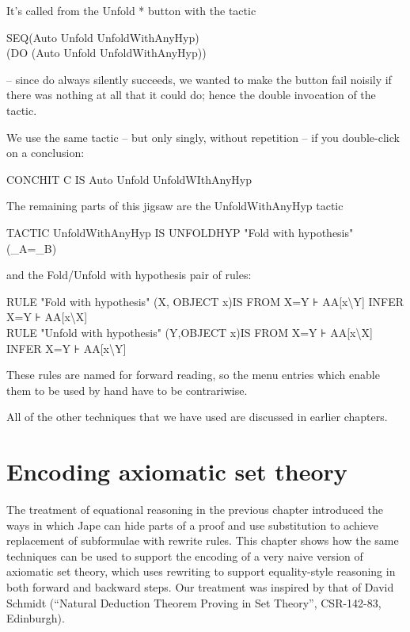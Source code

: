 \documentclass[11pt]{book}
\newcommand{\tab}{\hspace{5mm}}
\begin{document}
It's called from the Unfold * button with the tactic

SEQ\tab (Auto Unfold UnfoldWithAnyHyp) \\
\tab (DO (Auto Unfold UnfoldWithAnyHyp))


-- since do always silently succeeds, we wanted to make the button fail noisily if there was nothing at all that it could do; hence the double invocation of the tactic.


We use the same tactic -- but only singly, without repetition -- if you double-click on a conclusion:

CONCHIT C IS Auto Unfold UnfoldWIthAnyHyp


The remaining parts of this jigsaw are the UnfoldWithAnyHyp tactic

TACTIC UnfoldWithAnyHyp IS UNFOLDHYP "Fold with hypothesis" (\_A=\_B)


and the Fold/Unfold with hypothesis pair of rules:

RULE "Fold with hypothesis" (X, OBJECT x)\tab IS FROM X=Y ⊦ AA[x{\textbackslash}Y] INFER X=Y ⊦ AA[x{\textbackslash}X]\\
RULE "Unfold with hypothesis" (Y,OBJECT x)\tab IS FROM X=Y ⊦ AA[x{\textbackslash}X] INFER X=Y ⊦ AA[x{\textbackslash}Y]


These rules are named for forward reading, so the menu entries which enable them to be used by hand have to be contrariwise.


All of the other techniques that we have used are discussed in earlier chapters.



\chapter{Encoding axiomatic set theory}


The treatment of equational reasoning in the previous chapter introduced the ways in which Jape can hide parts of a proof and use substitution to achieve replacement of subformulae with rewrite rules. This chapter shows how the same techniques can be used to support the encoding of a very naive version of axiomatic set theory, which uses rewriting to support equality-style reasoning in both forward and backward steps. Our treatment was inspired by that of David Schmidt (``Natural Deduction Theorem Proving in Set Theory'', CSR-142-83, Edinburgh).
\end{document}
